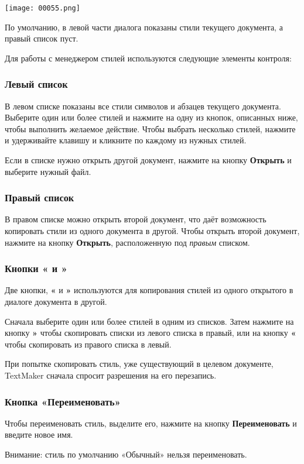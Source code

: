 ﻿\documentclass[a4paper,10pt]{article}
\begin{document}
\texttt{[image: 00055.png]}

По умолчанию, в левой части диалога показаны стили текущего документа, а правый список пуст.

Для работы с менеджером стилей используются следующие элементы контроля:

\subsubsection{Левый список}
В левом списке показаны все стили символов и абзацев текущего документа. Выберите один или более стилей и нажмите на одну из кнопок, описанных ниже, чтобы выполнить желаемое действие. Чтобы выбрать несколько стилей, нажмите и удерживайте клавишу  и кликните по каждому из нужных стилей.

Если в списке нужно открыть другой документ, нажмите на кнопку \textbf{Открыть} и выберите нужный файл.

\subsubsection{Правый список}
В правом списке можно открыть второй документ, что даёт возможность копировать стили из одного документа в другой. Чтобы открыть второй документ, нажмите на кнопку \textbf{Открыть}, расположенную под \textit{правым} списком.

\subsubsection{Кнопки « и »}
Две кнопки, \textbf{«} и \textbf{»} используются для копирования стилей из одного открытого в диалоге документа в другой.

Сначала выберите один или более стилей в одним из списков. Затем нажмите на кнопку \textbf{»} чтобы скопировать списки из левого списка в правый, или на кнопку \textbf{«} чтобы скопировать  из правого списка в левый.

При попытке скопировать стиль, уже существующий в целевом документе, TextMaker сначала спросит разрешения на его перезапись.

\subsubsection{Кнопка «Переименовать»}
Чтобы переименовать стиль, выделите его, нажмите на кнопку \textbf{Переименовать} и введите новое имя.

Внимание: стиль по умолчанию «Обычный» нельзя переименовать.
\end{document}
